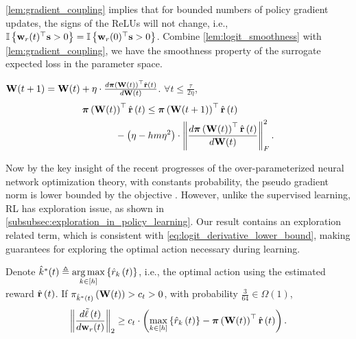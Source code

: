 \cref{lem:gradient_coupling} implies that for bounded numbers of policy gradient updates, the signs of the ReLUs will not change, i.e., ${\mathbb{I}}\left\{ {\mathbf{w}}_r(t)^\top {\mathbf{s}} > 0 \right\} = {\mathbb{I}}\left\{ {\mathbf{w}}_r(0)^\top {\mathbf{s}} > 0 \right\}$. Combine \cref{lem:logit_smoothness} with \cref{lem:gradient_coupling}, we have the smoothness property of the surrogate expected loss in the parameter space.
\begin{lem}
\label{lem:parameter_smoothness}
    ${\mathbf{W}}(t+1) = {\mathbf{W}}(t) + \eta \cdot \frac{d {\boldsymbol{\pi}}\left({\mathbf{W}}(t)\right)^\top \hat{{\mathbf{r}}}\left(t\right)}{d {\mathbf{W}}(t)}$. $\forall t \le \frac{\tau}{ 2 \eta }$,
\begin{equation}
\label{eq:parameter_smoothness}
\begin{split}
    \rvpi\left( \rmW(t) \right)^\top \hat{\rvr}\left(t\right) &\le \rvpi\left( \rmW(t+1) \right)^\top \hat{\rvr}\left(t\right) \\
    &\!\!\!\!\!\!\!\!\!\!\!\!\!\!\!\!\!\!\! - \left( \eta - h m \eta^2 \right) \cdot \left\| \frac{d \rvpi\left( \rmW(t) \right)^\top \hat{\rvr}\left(t\right)}{d \rmW(t)} \right\|_F^2.
\end{split}
\end{equation}
\end{lem}

Now by the key insight of the recent progresses of the over-parameterized neural network optimization theory, with constants probability, the pseudo gradient norm is lower bounded by the objective \citep{li2018learning}. However, unlike the supervised learning, RL has exploration issue, as shown in \cref{subsubsec:exploration_in_policy_learning}. Our result contains an exploration related term, which is consistent with \cref{eq:logit_derivative_lower_bound}, making guarantees for exploring the optimal action necessary during learning.

\begin{lem}
\label{lem:gradient_lower_bound}
	Denote $\hat{k}^*(t) \triangleq \operatorname*{arg\,max}\limits_{k \in [h]}\left\{ \hat{r}_{k}\left(t\right) \right\}$, i.e., the optimal action using the estimated reward $ \hat{{\mathbf{r}}}\left(t\right)$. If $\pi_{\hat{k}^*(t)}\left({\mathbf{W}}(t)\right) > c_t > 0$, with probability $\frac{3}{64} \in \Omega\left( 1 \right)$,
\begin{equation*}
\begin{split}
	\left\| \frac{d\tilde{\ell}\left(t\right)}{d {\mathbf{w}}_r(t)} \right\|_2 \ge c_t \cdot \left( \max\limits_{k \in \left[h\right]}\left\{ \hat{r}_k\left(t\right) \right\} - {\boldsymbol{\pi}}\left( {\mathbf{W}}(t) \right)^\top \hat{{\mathbf{r}}}\left(t\right) \right) .
\end{split}
\end{equation*}
\end{lem}

